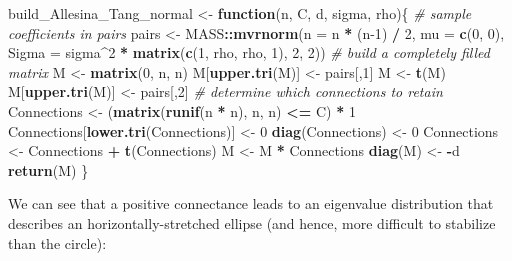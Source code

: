 \documentclass[
]{book}
\newenvironment{Shaded}{\begin{snugshade}}{\end{snugshade}}
\newcommand{\CommentTok}[1]{\textcolor[rgb]{0.56,0.35,0.01}{\textit{#1}}}
\newcommand{\ControlFlowTok}[1]{\textcolor[rgb]{0.13,0.29,0.53}{\textbf{#1}}}
\newcommand{\DataTypeTok}[1]{\textcolor[rgb]{0.13,0.29,0.53}{#1}}
\newcommand{\DecValTok}[1]{\textcolor[rgb]{0.00,0.00,0.81}{#1}}
\newcommand{\KeywordTok}[1]{\textcolor[rgb]{0.13,0.29,0.53}{\textbf{#1}}}
\newcommand{\NormalTok}[1]{#1}
\newcommand{\OperatorTok}[1]{\textcolor[rgb]{0.81,0.36,0.00}{\textbf{#1}}}
\newcommand{\StringTok}[1]{\textcolor[rgb]{0.31,0.60,0.02}{#1}}
\begin{document}
\begin{Shaded}
\begin{Highlighting}[]
\NormalTok{build_Allesina_Tang_normal <-}\StringTok{ }\ControlFlowTok{function}\NormalTok{(n, C, d, sigma, rho)\{}
  \CommentTok{# sample coefficients in pairs}
\NormalTok{  pairs <-}\StringTok{ }\NormalTok{MASS}\OperatorTok{::}\KeywordTok{mvrnorm}\NormalTok{(}\DataTypeTok{n =}\NormalTok{ n }\OperatorTok{*}\StringTok{ }\NormalTok{(n}\DecValTok{-1}\NormalTok{) }\OperatorTok{/}\StringTok{ }\DecValTok{2}\NormalTok{,}
                         \DataTypeTok{mu =} \KeywordTok{c}\NormalTok{(}\DecValTok{0}\NormalTok{, }\DecValTok{0}\NormalTok{),}
                         \DataTypeTok{Sigma =}\NormalTok{ sigma}\OperatorTok{^}\DecValTok{2} \OperatorTok{*}\StringTok{ }\KeywordTok{matrix}\NormalTok{(}\KeywordTok{c}\NormalTok{(}\DecValTok{1}\NormalTok{, rho, rho, }\DecValTok{1}\NormalTok{), }\DecValTok{2}\NormalTok{, }\DecValTok{2}\NormalTok{))}
  \CommentTok{# build a completely filled matrix}
\NormalTok{  M <-}\StringTok{ }\KeywordTok{matrix}\NormalTok{(}\DecValTok{0}\NormalTok{, n, n)}
\NormalTok{  M[}\KeywordTok{upper.tri}\NormalTok{(M)] <-}\StringTok{ }\NormalTok{pairs[,}\DecValTok{1}\NormalTok{]}
\NormalTok{  M <-}\StringTok{ }\KeywordTok{t}\NormalTok{(M)}
\NormalTok{  M[}\KeywordTok{upper.tri}\NormalTok{(M)] <-}\StringTok{ }\NormalTok{pairs[,}\DecValTok{2}\NormalTok{]}
  \CommentTok{# determine which connections to retain}
\NormalTok{  Connections <-}\StringTok{ }\NormalTok{(}\KeywordTok{matrix}\NormalTok{(}\KeywordTok{runif}\NormalTok{(n }\OperatorTok{*}\StringTok{ }\NormalTok{n), n, n) }\OperatorTok{<=}\StringTok{ }\NormalTok{C) }\OperatorTok{*}\StringTok{ }\DecValTok{1} 
\NormalTok{  Connections[}\KeywordTok{lower.tri}\NormalTok{(Connections)] <-}\StringTok{ }\DecValTok{0}
  \KeywordTok{diag}\NormalTok{(Connections) <-}\StringTok{ }\DecValTok{0}
\NormalTok{  Connections <-}\StringTok{ }\NormalTok{Connections }\OperatorTok{+}\StringTok{ }\KeywordTok{t}\NormalTok{(Connections)}
\NormalTok{  M <-}\StringTok{ }\NormalTok{M }\OperatorTok{*}\StringTok{ }\NormalTok{Connections}
  \KeywordTok{diag}\NormalTok{(M) <-}\StringTok{ }\OperatorTok{-}\NormalTok{d}
  \KeywordTok{return}\NormalTok{(M)}
\NormalTok{\}}
\end{Highlighting}
\end{Shaded}

We can see that a positive connectance leads to an eigenvalue distribution that describes an horizontally-stretched ellipse (and hence, more difficult to stabilize than the circle):
\end{document}
